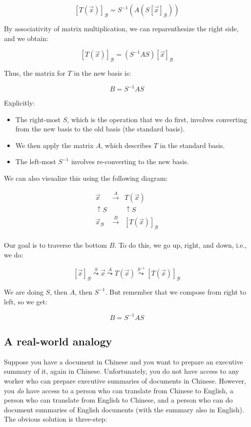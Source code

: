 \documentclass[10pt]{amsart}
\begin{document}
$$[T(\vec{x})]_{\mathcal{B}} = S^{-1}(A(S[\vec{x}]_{\mathcal{B}}))$$

By associativity of matrix multiplication, we can reparenthesize the right side, and we obtain:

$$[T(\vec{x})]_{\mathcal{B}} = (S^{-1}AS)[\vec{x}]_{\mathcal{B}}$$

Thus, the matrix for $T$ in the new basis is:

$$B = S^{-1}AS$$

Explicitly:

\begin{itemize}
\item The right-most $S$, which is the operation that we do first,
  involves converting from the new basis to the old basis (the standard basis).
\item We then apply the matrix $A$, which describes $T$ in the
  standard basis.
\item The left-most $S^{-1}$ involves re-converting to the new basis.
\end{itemize}

We can also visualize this using the following diagram:

$$\begin{array}{ccc}
\vec{x} & \stackrel{A}{\to} & T(\vec{x})\\
\uparrow S & & \uparrow S \\
\vec{x}_{\mathcal{B}} & \stackrel{B}{\to} & [T(\vec{x})]_{\mathcal{B}}\\
\end{array}$$

Our goal is to traverse the bottom $B$. To do this, we go up, right, and down, i.e., we do:

$$[\vec{x}]_{\mathcal{B}} \stackrel{S}{\leadsto} \vec{x} \stackrel{A}{\leadsto} T(\vec{x}) \stackrel{S^{-1}}{\leadsto} [T(\vec{x})]_{\mathcal{B}}$$

We are doing $S$, then $A$, then $S^{-1}$. But remember that we compose from right to left, so we get:

$$B = S^{-1}AS$$

\subsection{A real-world analogy}

Suppose you have a document in Chinese and you want to prepare an
executive summary of it, again in Chinese. Unfortunately, you do not
have access to any worker who can prepare executive summaries of
documents in Chinese. However, you {\em do} have access to a person
who can translate from Chinese to English, a person who can translate
from English to Chinese, and a person who can do document summaries of
English documents (with the summary also in English). The obvious
solution is three-step:
\end{document}
